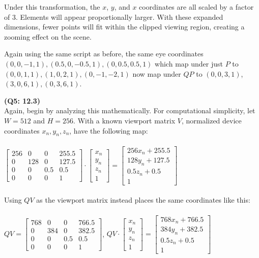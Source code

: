 \documentclass[letterpaper, 11pt]{article}
\begin{document}
Under this transformation, the $x$, $y$, and $x$ coordinates are all scaled by a factor of $3$. Elements will appear proportionally larger. With these expanded dimensions, fewer points will fit within the clipped viewing region, creating a zooming effect on the scene.

\medskip
Again using the same script as before, the same eye coordinates $(0, 0,-1, 1), (0.5, 0, -0.5, 1), (0, 0.5, 0.5, 1)$ which map under just $P$ to $(0, 0, 1, 1), (1, 0, 2, 1), (0, -1, -2, 1)$ now map under $QP$ to $(0, 0, 3, 1)$, $(3, 0, 6, 1), (0, 3, 6, 1)$. 


\medskip
\textbf{(Q5: 12.3)} \\ 
Again, begin by analyzing this mathematically. For computational simplicity, let $W = 512$ and $H = 256$. With a known viewport matrix $V$, normalized device coordinates $x_n, y_n, z_n$, have the following map: \\ \\ 
$\begin{bmatrix}
  256 & 0 & 0 & 255.5 \\ 
  0 & 128 & 0 & 127.5 \\ 
  0 & 0 & 0.5 & 0.5 \\ 
  0 & 0 & 0 & 1 
\end{bmatrix}
\cdot 
\begin{bmatrix}
  x_n \\ 
  y_n \\ 
  z_n \\
  1 
\end{bmatrix}
=
\begin{bmatrix}
  256x_n + 255.5 \\
  128y_n + 127.5 \\ 
  0.5z_n + 0.5 \\ 
  1
\end{bmatrix}$ \\ \\ 

Using $QV$ as the viewport matrix instead places the same coordinates like this: \\ \\ 
$QV = \begin{bmatrix}
  768 & 0 & 0 & 766.5 \\ 
  0 & 384 & 0 & 382.5 \\  
  0 & 0 & 0.5 & 0.5 \\ 
  0 & 0 & 0 & 1 
\end{bmatrix}$, 
$QV \cdot
\begin{bmatrix}
  x_n \\ 
  y_n \\ 
  z_n \\ 
  1
\end{bmatrix} = 
\begin{bmatrix}
  768x_n + 766.5 \\ 
  384y_n + 382.5 \\ 
  0.5z_n + 0.5 \\ 
  1
\end{bmatrix}$ \\ \\ 
\end{document}
